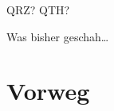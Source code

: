 

\subtitle{Technik Klasse E 00: \\
          Curriculum \& Organisatorisches \\[2em]}
\date{Stand 18.09.2017}



\begin{frame}
    \begin{center}
        \LARGE QRZ? \hspace{3em} QTH?
    \end{center}
\end{frame}

\begin{frame}
    \begin{center}
        \LARGE Was bisher geschah\dots
    \end{center}
\end{frame}

\section{Vorweg}

